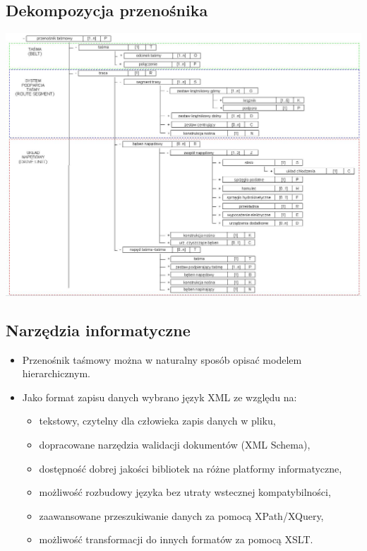 \documentclass{beamer}
\begin{document}
\subsection{Dekompozycja przenośnika}
\begin{frame}
\includegraphics[width=\textwidth]{beamer/struktura_word}
\end{frame}

\subsection{Narzędzia informatyczne}
\begin{frame}
\begin{itemize}
\item Przenośnik taśmowy można w naturalny sposób opisać modelem
  hierarchicznym.
\item Jako format zapisu danych wybrano język XML ze względu na:
\begin{itemize}
  \item tekstowy, czytelny dla człowieka zapis danych w pliku,
  \pause\item dopracowane narzędzia walidacji dokumentów (XML Schema),
  \pause\item dostępność dobrej jakości bibliotek na różne platformy
    informatyczne,
  \pause\item możliwość rozbudowy języka bez utraty wstecznej
    kompatybilności,
  \pause\item zaawansowane przeszukiwanie danych za pomocą XPath/XQuery,
  \item możliwość transformacji do innych formatów za pomocą XSLT.
\end{itemize}
\end{itemize}
\end{frame}
\end{document}
